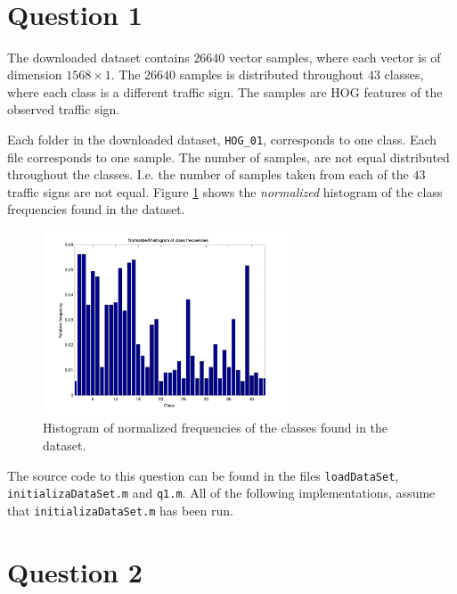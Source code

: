 \documentclass[10pt]{article}
\author{\authorName \\\texttt{\small{\authorEmail}}}
\title{\textsc{\titleName \\ \courseName}}
\begin{document}
\maketitle 


\section*{Question 1} %
\label{sec:question_1}

The downloaded dataset contains $26640$ vector samples, where each vector is of dimension $1568 \times 1$. The $26640$ samples is distributed throughout $43$ classes, where each class is a different traffic sign. The samples are HOG features of the observed traffic sign.

Each folder in the downloaded dataset, \texttt{HOG_01}, corresponds to one class. Each file corresponds to one sample. The number of samples, are not equal distributed throughout the classes. I.e. the number of samples taken from each of the $43$ traffic signs are not equal. Figure \ref{fig1} shows the \emph{normalized} histogram of the class frequencies found in the dataset.

\begin{figure}[ht]
\centering
\includegraphics[width=0.65\textwidth]{figures/q1.png}
\caption{Histogram of normalized frequencies of the classes found in the dataset.}
\label{fig1}
\end{figure}

The source code to this question can be found in the files \texttt{loadDataSet}, \texttt{initializaDataSet.m} and \texttt{q1.m}. All of the following implementations, assume that \texttt{initializaDataSet.m} has been run.


\section*{Question 2} %
\label{sec:question_2}
\end{document}
